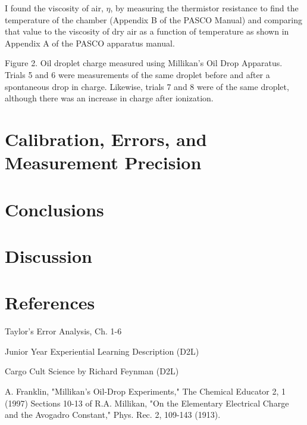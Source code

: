 \documentclass[11pt, oneside]{article}   	%
\begin{document}
I found the viscosity of air, $\eta$, by measuring the thermistor resistance to find the temperature of the chamber (Appendix B of the PASCO Manual) and comparing that value to the viscosity of dry air as a function of temperature as shown in Appendix A of the PASCO apparatus manual.


Figure 2. Oil droplet charge measured using Millikan's Oil Drop Apparatus. Trials 5 and 6 were measurements of the same droplet before and after a spontaneous drop in charge. Likewise, trials 7 and 8 were of the same droplet, although there was an increase in charge after ionization.
\section{Calibration, Errors, and Measurement Precision}

\section{Conclusions}

\section{Discussion}




\section{References}

Taylor's Error Analysis, Ch. 1-6

Junior Year Experiential Learning Description (D2L)

Cargo Cult Science by Richard Feynman (D2L)

A. Franklin, "Millikan's Oil-Drop Experiments," The Chemical Educator 2, 1 (1997)
Sections 10-13 of R.A. Millikan, "On the Elementary Electrical Charge and the Avogadro Constant," Phys. Rec. 2, 109-143 (1913).
\end{document}
